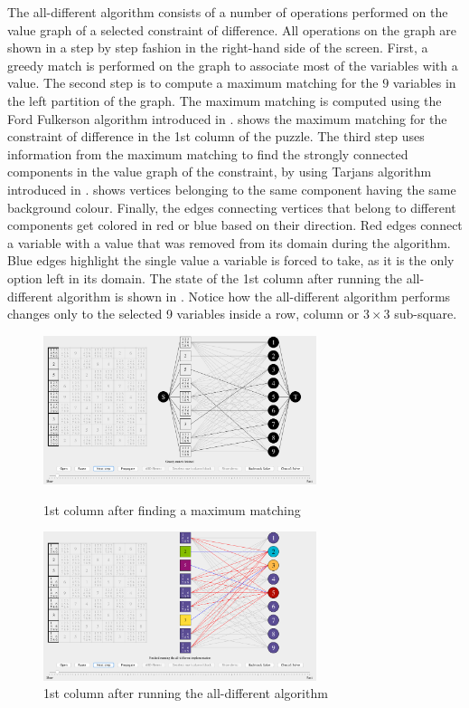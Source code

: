 \documentclass{l4proj}
\begin{document}
\noindent The all-different algorithm consists of a number of operations performed on the value graph of a selected constraint of difference. All operations on the graph are shown in a step by step fashion in the right-hand side of the screen. First, a greedy match is performed on the graph to associate most of the variables with a value. The second step is to compute a maximum matching for the $9$ variables in the left partition of the graph. The maximum matching is computed using the Ford Fulkerson algorithm  \cite{ford1956maximal} introduced in .  shows the maximum matching for the constraint of difference in the 1st column of the puzzle. The third step uses information from the maximum matching to find the strongly connected components in the value graph of the constraint, by using Tarjan\textquotesingle s algorithm \cite{tarjan1972depth} introduced in .  shows vertices belonging to the same component having the same background colour. Finally, the edges connecting vertices that belong to different components get colored in red or blue based on their direction. Red edges connect a variable with a value that was removed from its domain during the algorithm. Blue edges highlight the single value a variable is forced to take, as it is the only option left in its domain. The state of the 1st column after running the all-different algorithm is shown in . Notice how the all-different algorithm performs changes only to the selected 9 variables inside a row, column or $3\times 3$ sub-square.

\begin{figure}[H]
\begin{minipage}{8.0cm}
\centering
\includegraphics[width=8cm]{images/proof_of_concept/screenshot1.png}
\caption{1st column after finding a maximum matching}
\label{screenshot1}
\end{minipage}%
\hfill
\begin{minipage}{8.0cm}
\centering
\includegraphics[width=8cm]{images/proof_of_concept/screenshot2.png}
\caption{1st column after running the all-different algorithm}
\label{screenshot2}
\end{minipage}%
\end{figure}
\end{document}

